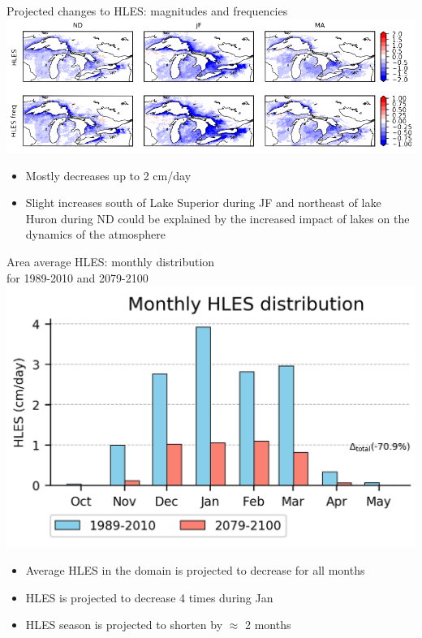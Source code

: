 \documentclass{beamer}
\begin{document}
  \begin{frame}{Projected changes to HLES: magnitudes and frequencies}
    \includegraphics[width=\textwidth]{projected_changes_to_hles.png}
    \begin{itemize}
      \item Mostly decreases up to 2 cm/day
      \item Slight increases south of Lake Superior during JF and northeast of lake Huron during ND could be explained by the increased impact of lakes on the dynamics of the atmosphere
    \end{itemize}
  \end{frame}


  \begin{frame}{Area average HLES: monthly distribution\\for 1989-2010 and 2079-2100}
    \centering
    \includegraphics[height=0.55\textheight]{hles_snow_histo_cc_m10_11_12_1_2_3_4_5_domain}
    \begin{itemize}
      \item Average HLES in the domain is projected to decrease for all months
      \item HLES is projected to decrease 4 times during Jan
      \item HLES season is projected to shorten by $\approx$ 2 months
    \end{itemize}
  \end{frame}
\end{document}

